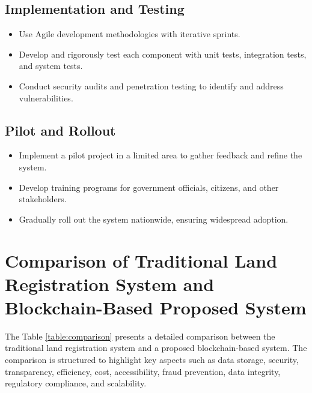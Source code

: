\documentclass[conference]{IEEEtran}
\begin{document}
\subsection{Implementation and Testing}
\begin{itemize}
    \item Use Agile development methodologies with iterative sprints.
    \item Develop and rigorously test each component with unit tests, integration tests, and system tests.
    \item Conduct security audits and penetration testing to identify and address vulnerabilities.
\end{itemize}

\subsection{Pilot and Rollout}
\begin{itemize}
    \item Implement a pilot project in a limited area to gather feedback and refine the system.
    \item Develop training programs for government officials, citizens, and other stakeholders.
    \item Gradually roll out the system nationwide, ensuring widespread adoption.
\end{itemize}

\section*{Comparison of Traditional Land Registration System and Blockchain-Based Proposed System}

The Table \ref{table:comparison} presents a detailed comparison between the traditional land registration system and a proposed blockchain-based system. The comparison is structured to highlight key aspects such as data storage, security, transparency, efficiency, cost, accessibility, fraud prevention, data integrity, regulatory compliance, and scalability.
\end{document}
